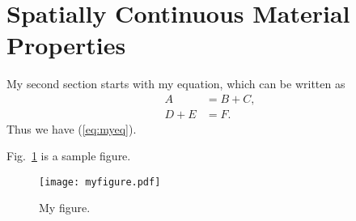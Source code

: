 \documentclass[11pt,a4paper,onecolumn,oneside]{report}
\begin{document}
%



\hbox{ }
\thispagestyle{empty}
\clearpage

\tableofcontents{}
\thispagestyle{empty}
\vfill
\clearpage

\listoffigures
\thispagestyle{empty}
\clearpage

\listoftables
\thispagestyle{empty}
\clearpage

\setcounter{page}{1}






\newpage 
\section{Spatially Continuous Material Properties} 

My second section starts with my equation, which can be written as 
%
\begin{equation}\label{eq:myeq}
\begin{split}
	A 		&= B + C, \\
    D + E	&= F.
\end{split}
\end{equation}
Thus we have (\ref{eq:myeq}).

Fig.~\ref{fig:myfigure} is a sample figure. 

\begin{figure}[h]
\centering
\texttt{[image: myfigure.pdf]}
\caption{My figure.} \label{fig:myfigure}
\end{figure}
\end{document}
